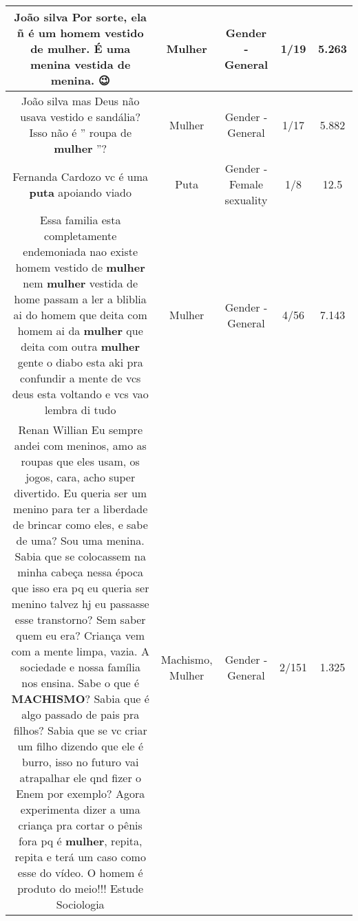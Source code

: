 \documentclass[11pt]{article}
\newlength\mylength
\begin{document}
\begin{center}
\begin{longtable}{|C{.65\mylength}|C{.30\mylength}|C{.12\mylength}|C{.12\mylength}|C{.12\mylength}|}
  \small João silva Por sorte, ela ñ é um homem vestido de \textbf{mulher}. É uma menina vestida de menina. 😉\normalsize   & Mulher & Gender - General & 1/19 & 5.263 \\  \hline
  \small João silva mas Deus não usava vestido e sandália? Isso não é '' roupa de \textbf{mulher} ''?\normalsize   & Mulher & Gender - General & 1/17 & 5.882 \\  \hline
  \small Fernanda Cardozo vc é uma \textbf{puta} apoiando viado\normalsize   & Puta & Gender - Female sexuality & 1/8 & 12.5 \\  \hline
  \small Essa familia esta completamente endemoniada nao existe homem vestido de \textbf{mulher} nem \textbf{mulher} vestida de home passam a ler a bliblia ai do homem que deita com homem ai da \textbf{mulher} que deita com outra \textbf{mulher} gente o diabo esta aki pra confundir a mente de vcs deus esta voltando e vcs vao lembra di tudo\normalsize   & Mulher & Gender - General & 4/56 & 7.143 \\  \hline
  \small Renan Willian Eu sempre andei com meninos, amo as roupas que eles usam, os jogos, cara, acho super divertido. Eu queria ser um menino para ter a liberdade de brincar como eles, e sabe de uma? Sou uma menina. Sabia que se colocassem na minha cabeça nessa época que isso era pq eu queria ser menino talvez hj eu passasse esse transtorno? Sem saber quem eu era? Criança vem com a mente limpa, vazia. A sociedade e nossa família nos ensina. Sabe o que é \textbf{MACHISMO}? Sabia que é algo passado de pais pra filhos? Sabia que se vc criar um filho dizendo que ele é burro, isso no futuro vai atrapalhar ele qnd fizer o Enem por exemplo? Agora experimenta dizer a uma criança pra cortar o pênis fora pq é \textbf{mulher}, repita, repita e terá um caso como esse do vídeo. O homem é produto do meio!!! Estude Sociologia\normalsize   & Machismo, Mulher & Gender - General & 2/151 & 1.325 \\  \hline

\end{longtable}
\end{center}
\end{document}
